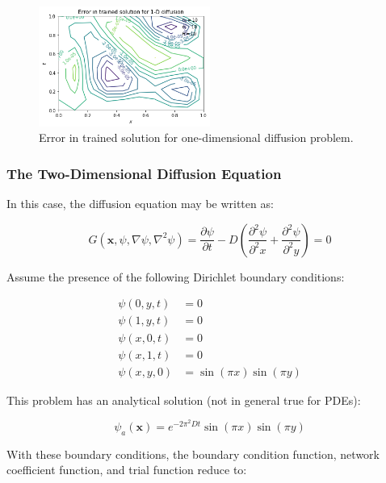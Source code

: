 \documentclass{article}
\begin{document}
\begin{figure}
    \centering
    \includegraphics[width=0.5\textwidth]{figures/diff1d_error.png}
    \caption{Error in trained solution for one-dimensional diffusion problem.}
    \label{fig:diff1d_error}
\end{figure}

\subsubsection{The Two-Dimensional Diffusion Equation}

In this case, the diffusion equation may be written as:

\begin{equation}
  G \left( \mathbf x, \psi, \nabla \psi, \nabla^2 \psi \right) = \frac {\partial \psi} {\partial t} - D \left( \frac {\partial^2 \psi} {\partial^2 x} +  \frac {\partial^2 \psi} {\partial^2 y} \right) = 0
\end{equation}

Assume the presence of the following Dirichlet boundary conditions:

\begin{equation}
\begin{split}
  \psi(0,y,t) &= 0 \\
  \psi(1,y,t) &= 0 \\
  \psi(x,0,t) &= 0 \\
  \psi(x,1,t) &= 0 \\
  \psi(x,y,0) &= \sin(\pi x) \sin(\pi y)
\end{split}
\end{equation}

This problem has an analytical solution (not in general true for PDEs):

\begin{equation}
  \psi_a(\mathbf x) = e^{-2\pi^2 D t} \sin(\pi x) \sin(\pi y)
\end{equation}

With these boundary conditions, the boundary condition function, network coefficient function, and trial function reduce to:
\end{document}
